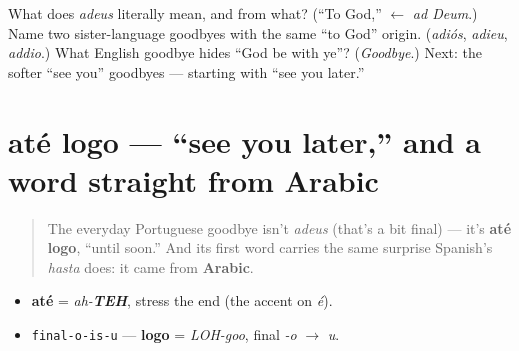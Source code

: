 \begin{tcolorbox}[breakable,colback=teal!4,colframe=teal!35!black,title={Before you move on}]
What does \emph{adeus} literally mean, and from what? (\textquotedblleft{}To God,\textquotedblright{} $\leftarrow$ \emph{ad Deum}.) Name two sister-language goodbyes with the same \textquotedblleft{}to God\textquotedblright{} origin. (\emph{adiós}, \emph{adieu}, \emph{addio}.) What English goodbye hides \textquotedblleft{}God be with ye\textquotedblright{}? (\emph{Goodbye}.) Next: the softer \textquotedblleft{}see you\textquotedblright{} goodbyes — starting with \textquotedblleft{}see you later.\textquotedblright{}
\end{tcolorbox}
\section[até logo]{até logo — \textquotedblleft{}see you later,\textquotedblright{} and a word straight from Arabic}

\label{lesson:PT-C04-ate-logo}



\begin{quote}
The everyday Portuguese goodbye isn't \emph{adeus} (that's a bit final) — it's \textbf{até logo}, \textquotedblleft{}until soon.\textquotedblright{} And its first word carries the same surprise Spanish's \emph{hasta} does: it came from \textbf{Arabic}.
\end{quote}

\begin{sounds}
\begin{itemize}
\raggedright
  \item \textbf{até} = \emph{ah-\textbf{TEH}}, stress the end (the accent on \emph{é}).
  \item \texttt{final-o-is-u} — \textbf{logo} = \emph{LOH-goo}, final \emph{-o} $\to$ \emph{u}.
\end{itemize}
\end{sounds}

